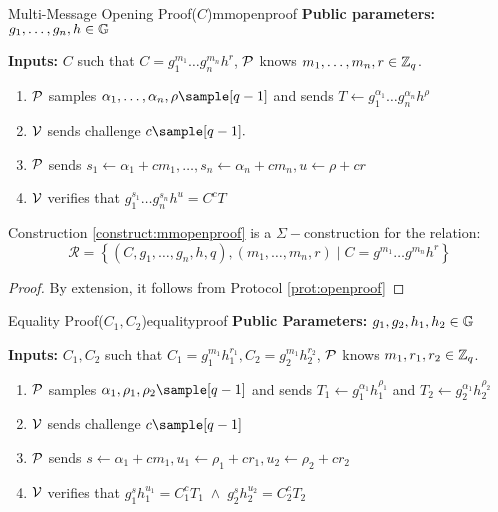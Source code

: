 \newpage
\begin{construction}{Multi-Message Opening Proof($C$)}{mmopenproof}
    \vspace{1em}
    \textbf{Public parameters:} $g_1, \dots, g_n, h \in \mathbb{G}$

    \textbf{Inputs:} $C$ such that $C = g_1^{m_1}\dots g_n^{m_n}h^r$, $\mathcal{P}$ knows $m_1, \dots, m_n, r \in \mathbb{Z}_q$.
    \vspace{1em}
        \begin{enumerate}
            \item $\mathcal{P}$ samples $\alpha_1, \dots, \alpha_n, \rho \sample [q-1]$ and sends $T \gets g_1^{\alpha_1} \dots g_n^{\alpha_n}h^{\rho}$
            
            \item $\mathcal{V}$ sends challenge $c \sample [q-1].$
        
            \item $\mathcal{P}$ sends $s_1 \gets \alpha_1 + cm_1, \dots, s_n \gets \alpha_n + cm_n, u \gets \rho + cr$
        
            \item $\mathcal{V}$ verifies that $g_1^{s_1} \dots g_n^{s_n} h^{u} = C^cT$
        \end{enumerate}
\end{construction}


\begin{theorem}
    Construction \ref{construct:mmopenproof} is a $\Sigma-$construction for the relation: 
    \[
    \mathcal{R} = \left\{ (C,g_1,\dots, g_n, h, q),(m_1, \dots ,m_n,r) \; | \; C = g^{m_1}\dots g^{m_n}h^r \right\}
    \]    
\end{theorem}
\begin{proof}
  By extension, it follows from Protocol \ref{prot:openproof}
\end{proof}




\begin{construction}{Equality Proof($C_1, C_2$)}{equalityproof}
    \vspace{1em}
    \textbf{Public Parameters:} $g_1, g_2, h_1, h_2 \in \mathbb{G}$

    \textbf{Inputs:} $C_1, C_2$ such that $C_1 = g_1^{m_1}h_1^{r_1}, C_2 = g_2^{m_1}h_2^{r_2}$, $\mathcal{P}$ knows $m_1, r_1, r_2 \in \mathbb{Z}_q$.
    \vspace{1em}
        \begin{enumerate}
            \item $\mathcal{P}$ samples $\alpha_1, \rho_1, \rho_2 \sample [q-1]$ and sends $T_1 \gets g_1^{\alpha_1}h_1^{\rho_1}$ and $T_2 \gets g_2^{\alpha_1}h_2^{\rho_2}$
            \item $\mathcal{V}$ sends challenge $c \sample [q-1]$
            \item $\mathcal{P}$ sends $s \gets \alpha_1 + cm_1, u_1 \gets \rho_1 + cr_1, u_2 \gets \rho_2 + cr_2$
            \item $\mathcal{V}$ verifies that $g_1^sh_1^{u_1} = C_1^cT_1 \; \wedge \; g_2^sh_2^{u_2} = C_2^cT_2$
        \end{enumerate}
\end{construction}
    

